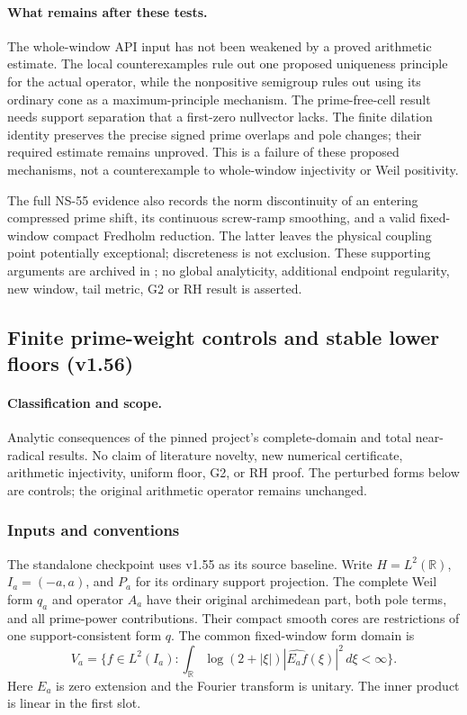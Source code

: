 \documentclass[11pt]{article}
\theoremstyle{remark}
\begin{document}
\paragraph{What remains after these tests.}
The whole-window API input has not been weakened by a proved arithmetic
estimate. The local counterexamples rule out one proposed uniqueness
principle for the actual operator, while the nonpositive semigroup rules
out using its ordinary cone as a maximum-principle mechanism. The
prime-free-cell result needs support separation that a first-zero
nullvector lacks. The finite dilation identity preserves the precise
signed prime overlaps and pole changes; their required estimate remains
unproved. This is a failure of these proposed mechanisms, not a
counterexample to whole-window injectivity or Weil positivity.

The full NS-55 evidence also records the norm discontinuity of an
entering compressed prime shift, its continuous screw-ramp smoothing,
and a valid fixed-window compact Fredholm reduction. The latter leaves
the physical coupling point potentially exceptional; discreteness is
not exclusion. These supporting arguments are archived in
; no global analyticity, additional endpoint
regularity, new window, tail metric, G2 or RH result is asserted.

\subsection{Finite prime-weight controls and stable lower floors (v1.56)}
\label{sec:v156-prime-weight-controls}

\paragraph{Classification and scope.} Analytic consequences of the pinned project's complete-domain
and total near-radical results. No claim of literature novelty, new numerical
certificate, arithmetic injectivity, uniform floor, G2, or RH proof.
The perturbed forms below are controls; the original arithmetic operator remains unchanged.

\subsubsection*{Inputs and conventions}
The standalone checkpoint uses v1.55 as its source baseline.
Write $H=L^2(\mathbb R)$, $I_a=(-a,a)$, and $P_a$ for its ordinary support projection.
The complete Weil form $q_a$ and operator $A_a$ have their original
archimedean part, both pole terms, and all prime-power contributions.
Their compact smooth cores are restrictions of one support-consistent form $q$.
The common fixed-window form domain is
\[
 V_a=\{f\in L^2(I_a):\int_\mathbb R\log(2+|\xi|)
           |\widehat{E_af}(\xi)|^2\,d\xi<\infty\}.
\]
Here $E_a$ is zero extension and the Fourier transform is unitary.
The inner product is linear in the first slot.
\end{document}
